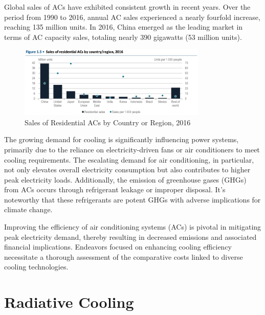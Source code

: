 Global sales of ACs have exhibited consistent growth in recent years. Over the period from 1990 to 2016, annual AC sales experienced a nearly fourfold increase, reaching 135 million units. In 2016, China emerged as the leading market in terms of AC capacity sales, totaling nearly 390 gigawatts (53 million units). %

\begin{figure}
  \centering
  \includegraphics[width=0.8\textwidth]{Chapters/Figures/Sales of Residential ACs by Country or Region, 2016.jpg}
  \caption{Sales of Residential ACs by Country or Region, 2016}
\end{figure}

The growing demand for cooling is significantly influencing power systems, primarily due to the reliance on electricity-driven fans or air conditioners to meet cooling requirements. The escalating demand for air conditioning, in particular, not only elevates overall electricity consumption but also contributes to higher peak electricity loads. Additionally, the emission of greenhouse gases (GHGs) from ACs occurs through refrigerant leakage or improper disposal. It's noteworthy that these refrigerants are potent GHGs with adverse implications for climate change. %

Improving the efficiency of air conditioning systems (ACs) is pivotal in mitigating peak electricity demand, thereby resulting in decreased emissions and associated financial implications. Endeavors focused on enhancing cooling efficiency necessitate a thorough assessment of the comparative costs linked to diverse cooling technologies. %

\section{Radiative Cooling}

